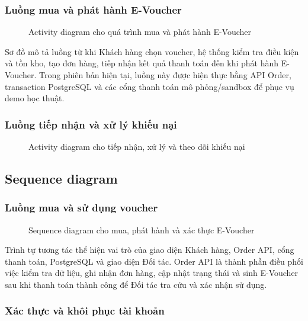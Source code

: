 \subsubsection{Luồng mua và phát hành E-Voucher}

\begin{figure}[H]
\centering
{}
\caption{Activity diagram cho quá trình mua và phát hành E-Voucher}
\end{figure}

Sơ đồ mô tả luồng từ khi Khách hàng chọn voucher, hệ thống kiểm tra điều kiện và tồn kho, tạo đơn hàng, tiếp nhận kết quả thanh toán đến khi phát hành E-Voucher. Trong phiên bản hiện tại, luồng này được hiện thực bằng API Order, transaction PostgreSQL và các cổng thanh toán mô phỏng/sandbox để phục vụ demo học thuật.

\subsubsection{Luồng tiếp nhận và xử lý khiếu nại}

\begin{figure}[H]
\centering
{}
\caption{Activity diagram cho tiếp nhận, xử lý và theo dõi khiếu nại}
\end{figure}

\subsection{Sequence diagram}

\subsubsection{Luồng mua và sử dụng voucher}

\begin{figure}[H]
\centering
{}
\caption{Sequence diagram cho mua, phát hành và xác thực E-Voucher}
\end{figure}

Trình tự tương tác thể hiện vai trò của giao diện Khách hàng, Order API, cổng thanh toán, PostgreSQL và giao diện Đối tác. Order API là thành phần điều phối việc kiểm tra dữ liệu, ghi nhận đơn hàng, cập nhật trạng thái và sinh E-Voucher sau khi thanh toán thành công để Đối tác tra cứu và xác nhận sử dụng.

\subsubsection{Xác thực và khôi phục tài khoản}

